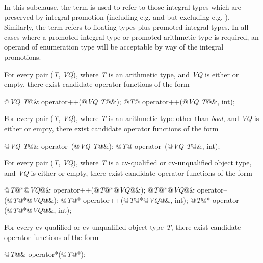 \pnum
In this subclause, the term
is used to refer to those integral types which are preserved by
integral promotion (including e.g.
and
but excluding e.g.
).
Similarly, the term
refers to floating types plus promoted integral types.
\enternote
In all cases where a promoted integral type or promoted arithmetic type is
required, an operand of enumeration type will be acceptable by way of the
integral promotions.
\exitnote

\pnum
For every pair
(\textit{T},
\textit{VQ}),
where
\textit{T}
is an arithmetic type, and
\textit{VQ}
is either
or empty,
there exist candidate operator functions of the form

\begin{codeblock}
@\textit{VQ T}@& operator++(@\textit{VQ T}@&);
@\textit{T}@ operator++(@\textit{VQ T}@&, int);
\end{codeblock}

\pnum
For every pair
(\textit{T},
\textit{VQ}),
where
\textit{T}
is an arithmetic type other than
\textit{bool},
and
\textit{VQ}
is either
or empty,
there exist candidate operator functions of the form

\begin{codeblock}
@\textit{VQ T}@& operator--(@\textit{VQ T}@&);
@\textit{T}@ operator--(@\textit{VQ T}@&, int);
\end{codeblock}

\pnum
For every pair
(\textit{T},
\textit{VQ}),
where
\textit{T}
is a cv-qualified or cv-unqualified object type, and
\textit{VQ}
is either
or empty,
there exist candidate operator functions of the form

\begin{codeblock}
@\textit{T}@*@\textit{VQ}@& operator++(@\textit{T}@*@\textit{VQ}@&);
@\textit{T}@*@\textit{VQ}@& operator--(@\textit{T}@*@\textit{VQ}@&);
@\textit{T}@*    operator++(@\textit{T}@*@\textit{VQ}@&, int);
@\textit{T}@*    operator--(@\textit{T}@*@\textit{VQ}@&, int);
\end{codeblock}

\pnum
For every cv-qualified or cv-unqualified object type
\textit{T},
there exist candidate operator functions of the form

\begin{codeblock}
@\textit{T}@&    operator*(@\textit{T}@*);
\end{codeblock}

